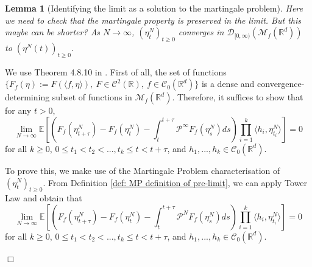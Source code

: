 \documentclass[12pt]{article}
\newenvironment {proof}{{\noindent\bf Proof }}{\hfill $\Box$ \medskip}
\newtheorem{lemma}[theorem]{Lemma}
\newcommand{\Pgen}{\mathcal{P}}    %
\newcommand{\comment}[1]{{\color{blue} \it #1}}
\begin{document}
\begin{lemma}[Identifying the limit as a solution to the martingale problem]
    \label{lem:limit_mgale}
    \comment{
        Here we need to check that the martingale property is preserved in the limit.
        But this maybe can be shorter?}
As $N \to \infty$,
$(\eta^{N}_t)_{t \geq 0}$ converges in $\mathcal{D}_{[0,\infty)}(\mathcal{M}_f(\mathbb{R}^d))$
to $(\eta^{N}(t))_{t \geq 0}$.
\end{lemma}
\begin{proof}
We use Theorem 4.8.10 in \cite{EK}.
First of all, the set of functions
$\{F_f(\eta):= F(\langle f, \eta \rangle ),~
F \in \mathcal{C}^{2}(\mathbb{R}), ~
f \in \mathcal{C}_{0}(\mathbb{R}^d)\}$
is a dense and convergence-determining 
subset of functions in $\mathcal{M}_f(\mathbb{R}^d)$.
Therefore, it suffices to show that for any $t>0$,
\begin{equation}
    \label{eq: Convergence Condition}
\lim_{N \to \infty}
\mathbb{E}\left[
\left(
F_f(\eta^{N}_{t+\tau})-F_f(\eta^{N}_t)
-\int_{t}^{t+\tau}\Pgen^{\infty}F_f(\eta^{N}_s)ds
\right)
\prod_{i=1}^{k}\langle h_i,\eta^{N}_{t_i} \rangle
\right]=0
\end{equation}
for all $k\geq 0$, $0\leq t_1<t_2<...,t_k \leq t < t+\tau$,
and $h_1,...,h_k \in \mathcal{C}_{0}(\mathbb{R}^d)$.

To prove this,
we make use of the Martingale Problem characterisation
of $(\eta^{N}_t)_{t \geq 0}$.
From Definition \ref{def: MP definition of pre-limit},
we can apply Tower Law
and obtain that
\begin{equation}
    \label{eq: Prelimit MP Application}
\lim_{N \to \infty}
\mathbb{E}\left[
\left(
F_f(\eta^{N}_{t+\tau})-F_f(\eta^{N}_t)
-\int_{t}^{t+\tau}\Pgen^{N}F_f(\eta^{N}_s)ds
\right)
\prod_{i=1}^{k}\langle h_i,\eta^{N}_{t_i} \rangle
\right]=0
\end{equation}
for all $k\geq 0$, $0\leq t_1<t_2<...,t_k \leq t < t+\tau$,
and $h_1,...,h_k \in \mathcal{C}_{0}(\mathbb{R}^d)$.


\end{proof}
\end{document}

